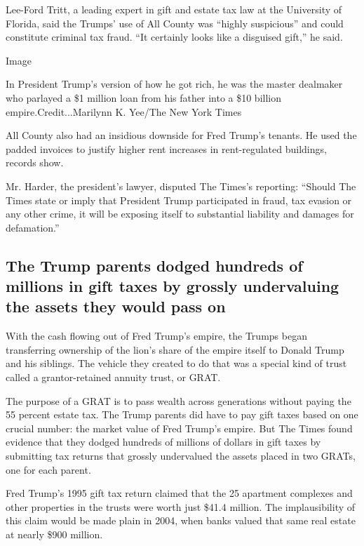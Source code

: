 Lee-Ford Tritt, a leading expert in gift and estate tax law at the
University of Florida, said the Trumps' use of All County was ``highly
suspicious'' and could constitute criminal tax fraud. ``It certainly
looks like a disguised gift,'' he said.

Image

In President Trump's version of how he got rich, he was the master
dealmaker who parlayed a \$1 million loan from his father into a \$10
billion empire.Credit...Marilynn K. Yee/The New York Times

All County also had an insidious downside for Fred Trump's tenants. He
used the padded invoices to justify higher rent increases in
rent-regulated buildings, records show.

Mr. Harder, the president's lawyer, disputed The Times's reporting:
``Should The Times state or imply that President Trump participated in
fraud, tax evasion or any other crime, it will be exposing itself to
substantial liability and damages for defamation.''

\hypertarget{the-trump-parents-dodged-hundreds-of-millions-in-gift-taxes-by-grossly-undervaluing-the-assets-they-would-pass-on}{%
\subsection{The Trump parents dodged hundreds of millions in gift taxes
by grossly undervaluing the assets they would pass
on}\label{the-trump-parents-dodged-hundreds-of-millions-in-gift-taxes-by-grossly-undervaluing-the-assets-they-would-pass-on}}

With the cash flowing out of Fred Trump's empire, the Trumps began
transferring ownership of the lion's share of the empire itself to
Donald Trump and his siblings. The vehicle they created to do that was a
special kind of trust called a grantor-retained annuity trust, or GRAT.

The purpose of a GRAT is to pass wealth across generations without
paying the 55 percent estate tax. The Trump parents did have to pay gift
taxes based on one crucial number: the market value of Fred Trump's
empire. But The Times found evidence that they dodged hundreds of
millions of dollars in gift taxes by submitting tax returns that grossly
undervalued the assets placed in two GRATs, one for each parent.

Fred Trump's 1995 gift tax return claimed that the 25 apartment
complexes and other properties in the trusts were worth just \$41.4
million. The implausibility of this claim would be made plain in 2004,
when banks valued that same real estate at nearly \$900 million.

